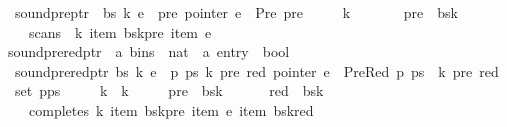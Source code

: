 \begin{isabellebody}
\ \ {\isachardoublequoteopen}sound{\isacharunderscore}{\kern0pt}pre{\isacharunderscore}{\kern0pt}ptr\ {\isasymomega}\ bs\ k\ e\ {\isasymequiv}\ {\isasymforall}pre{\isachardot}{\kern0pt}\ pointer\ e\ {\isacharequal}{\kern0pt}\ Pre\ pre\ {\isasymlongrightarrow}\isanewline
\ \ \ \ k\ {\isachargreater}{\kern0pt}\ {}\ {\isasymand}\isanewline
\ \ \ \ pre\ {\isacharless}{\kern0pt}\ {\isacharbar}{\kern0pt}bs{\isacharbang}{\kern0pt}{\isacharparenleft}{\kern0pt}k{\isacharminus}{\kern0pt}{}{\isacharparenright}{\kern0pt}{\isacharbar}{\kern0pt}\ {\isasymand}\isanewline
\ \ \ \ scans\ {\isasymomega}\ k\ {\isacharparenleft}{\kern0pt}item\ {\isacharparenleft}{\kern0pt}bs{\isacharbang}{\kern0pt}{\isacharparenleft}{\kern0pt}k{\isacharminus}{\kern0pt}{}{\isacharparenright}{\kern0pt}{\isacharbang}{\kern0pt}pre{\isacharparenright}{\kern0pt}{\isacharparenright}{\kern0pt}\ {\isacharparenleft}{\kern0pt}item\ e{\isacharparenright}{\kern0pt}{\isachardoublequoteclose}\isanewline
\isanewline
{}\isamarkupfalse%
\ sound{\isacharunderscore}{\kern0pt}prered{\isacharunderscore}{\kern0pt}ptr\ {\isacharcolon}{\kern0pt}{\isacharcolon}{\kern0pt}\ {\isachardoublequoteopen}{\isacharprime}{\kern0pt}a\ bins\ {\isasymRightarrow}\ nat\ {\isasymRightarrow}\ {\isacharprime}{\kern0pt}a\ entry\ {\isasymRightarrow}\ bool{\isachardoublequoteclose}\ \isanewline
\ \ {\isachardoublequoteopen}sound{\isacharunderscore}{\kern0pt}prered{\isacharunderscore}{\kern0pt}ptr\ bs\ k\ e\ {\isasymequiv}\ {\isasymforall}p\ ps\ k{\isacharprime}{\kern0pt}\ pre\ red{\isachardot}{\kern0pt}\ pointer\ e\ {\isacharequal}{\kern0pt}\ PreRed\ p\ ps\ {\isasymand}\ {\isacharparenleft}{\kern0pt}k{\isacharprime}{\kern0pt}{\isacharcomma}{\kern0pt}\ pre{\isacharcomma}{\kern0pt}\ red{\isacharparenright}{\kern0pt}\ {\isasymin}\ set\ {\isacharparenleft}{\kern0pt}p{\isacharhash}{\kern0pt}ps{\isacharparenright}{\kern0pt}\ {\isasymlongrightarrow}\isanewline
\ \ \ \ k{\isacharprime}{\kern0pt}\ {\isacharless}{\kern0pt}\ k\ {\isasymand}\isanewline
\ \ \ \ pre\ {\isacharless}{\kern0pt}\ {\isacharbar}{\kern0pt}bs{\isacharbang}{\kern0pt}k{\isacharprime}{\kern0pt}{\isacharbar}{\kern0pt}\ {\isasymand}\ \isanewline
\ \ \ \ red\ {\isacharless}{\kern0pt}\ {\isacharbar}{\kern0pt}bs{\isacharbang}{\kern0pt}k{\isacharbar}{\kern0pt}\ {\isasymand}\isanewline
\ \ \ \ completes\ k\ {\isacharparenleft}{\kern0pt}item\ {\isacharparenleft}{\kern0pt}bs{\isacharbang}{\kern0pt}k{\isacharprime}{\kern0pt}{\isacharbang}{\kern0pt}pre{\isacharparenright}{\kern0pt}{\isacharparenright}{\kern0pt}\ {\isacharparenleft}{\kern0pt}item\ e{\isacharparenright}{\kern0pt}\ {\isacharparenleft}{\kern0pt}item\ {\isacharparenleft}{\kern0pt}bs{\isacharbang}{\kern0pt}k{\isacharbang}{\kern0pt}red{\isacharparenright}{\kern0pt}{\isacharparenright}{\kern0pt}{\isachardoublequoteclose}\isanewline

\end{isabellebody}
